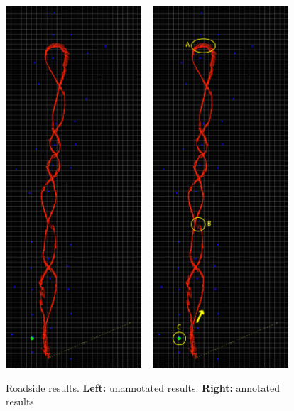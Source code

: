 \documentclass[12pt,oneside,a4paper]{book}
\begin{document}
\begin{figure}
  \centering
  \includegraphics[width=0.45\textwidth]{figs/roadside-results}
  ~
  \includegraphics[width=0.45\textwidth]{figs/roadside-results-annotated}
  \caption{Roadside results. \textbf{Left:} unannotated
    results. \textbf{Right:} annotated results}
  \label{fig:roadside-results}
\end{figure}
\end{document}
